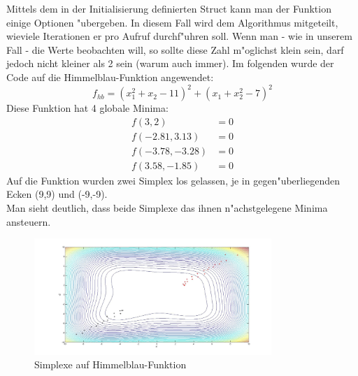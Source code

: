 Mittels dem in der Initialisierung definierten Struct kann man der Funktion einige Optionen "ubergeben. 
In diesem Fall wird dem Algorithmus mitgeteilt, wieviele Iterationen er pro Aufruf durchf"uhren soll. 
Wenn man - wie in unserem Fall - die Werte beobachten will, so sollte diese Zahl m"oglichst klein sein, darf jedoch nicht kleiner als 2 sein (warum auch immer).
Im folgenden wurde der Code auf die Himmelblau-Funktion angewendet: 
\begin{equation}
	f_{hb} = (x_1^2 + x_2 -11)^2 + (x_1+x_2^2-7)^2
\end{equation}
Diese Funktion hat 4 globale Minima: 
\begin{subequations}
	\begin{align}
		f(3,2) &= 0 \\
		f(-2.81,3.13) &= 0\\
		f(-3.78,-3.28) &= 0\\
		f(3.58,-1.85) &= 0
	\end{align}
\end{subequations}
Auf die Funktion wurden zwei Simplex los gelassen, je in gegen"uberliegenden Ecken (9,9) und (-9,-9).\\
Man sieht deutlich, dass beide Simplexe das ihnen n"achstgelegene Minima ansteuern. 
\begin{figure}[h]
	\centering
	\includegraphics[width=0.8\textwidth]{../bilder/HimmelblauHoehen.jpg}%
  	\caption{Simplexe auf Himmelblau-Funktion}%
	\label{fig:HB1}%
\end{figure}


